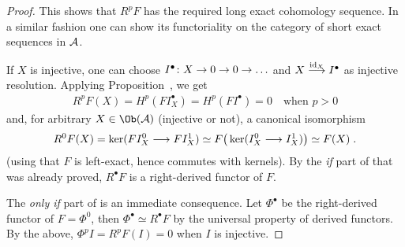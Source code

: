 \documentclass[a4paper,parskip=half,numbers=enddot, DIV=12]{scrreprt}
\begin{document}
\begin{proof}
		This shows that $R^pF$ has the required long exact cohomology sequence. In a similar fashion one can show its functoriality on the category of short exact sequences in $\mathcal{A}$.
		
		If $X$ is injective, one can choose $I^\bullet \colon X\morphism 0\morphism 0\morphism\ldots$ and $X\morphism[\id_X]I^\bullet $ as injective resolution. Applying Proposition~, we get 
		\begin{align*}
			R^pF(X)=H^p(FI_X^\bullet )=H^p(FI^\bullet )=0\quad\text{when }p>0
		\end{align*}
		and, for arbitrary $X\in\Ob(\Aa)$ (injective or not), a canonical isomorphism
		\begin{align*}
			R^0F(X)=\ker(FI_X^0\morphism FI_X^1)\simeq F\big(\ker(I_X^0\morphism I_X^1)\big)\simeq F(X)\;.
		\end{align*}
		(using that $F$ is left-exact, hence commutes with kernels). By the \emph{if} part of  that was already proved, $R^\bullet F$ is a right-derived functor of $F$.
		
		The \emph{only if} part of  is an immediate consequence. Let $\Phi^\bullet $ be the right-derived functor of $F=\Phi^0$, then $\Phi^\bullet \simeq R^\bullet F$ by the universal property of derived functors. By the above, $\Phi^pI=R^pF(I)=0$ when $I$ is injective.
		

\end{proof}
\end{document}
